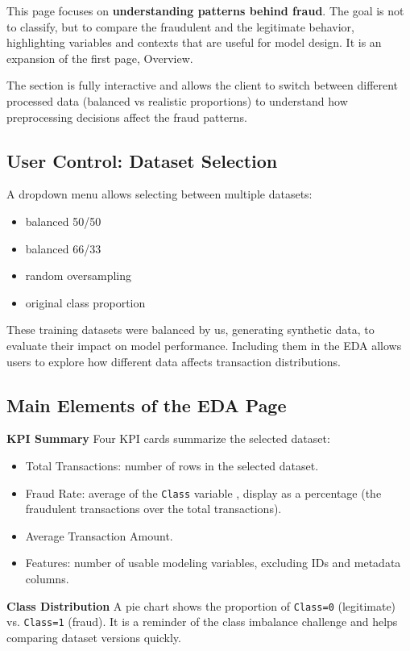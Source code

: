 \documentclass[12pt,a4paper]{report}
\begin{document}
This page focuses on \textbf{understanding patterns behind fraud}. The goal is not to classify, but to compare the fraudulent and the legitimate behavior, highlighting variables and contexts that are useful for model design. It is an expansion of the first page, Overview.

The section is fully interactive and allows the client to switch between different processed data (balanced vs realistic proportions) to understand how preprocessing decisions affect the fraud patterns.

\subsection{User Control: Dataset Selection}

A dropdown menu allows selecting between multiple datasets: 
\begin{itemize}
    \item balanced 50/50
    \item balanced 66/33
    \item random oversampling
    \item original class proportion
\end{itemize}

These training datasets were balanced by us, generating synthetic data, to evaluate their impact on model performance. Including them in the EDA allows users to explore how different data affects transaction distributions.

\subsection{Main Elements of the EDA Page}

\textbf{KPI Summary}
Four KPI cards summarize the selected dataset:

\begin{itemize}
    \item Total Transactions: number of rows in the selected dataset.
    \item Fraud Rate: average of the \texttt{Class} variable , display as a percentage (the fraudulent transactions over the total transactions).
    \item Average Transaction Amount.
    \item Features: number of usable modeling variables, excluding IDs and metadata columns.
\end{itemize}

\textbf{Class Distribution}
A pie chart shows the proportion of \texttt{Class=0} (legitimate) vs. \texttt{Class=1} (fraud). It is a reminder of the class imbalance challenge and helps comparing dataset versions quickly.
\end{document}
